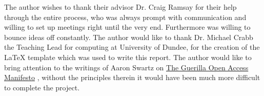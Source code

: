 \documentclass[sigconf, nonacm]{acmart}
\begin{document}
\begin{acks}
The author wishes to thank their advisor Dr. Craig Ramsay for their help through the entire process, who was always prompt with communication and willing to set up meetings right until the very end. Furthermore was willing to bounce ideas off constantly.
\newline
\newline
The author would like to thank Dr. Michael Crabb the Teaching Lead for computing at University of Dundee, for the creation of the LaTeX template which was used to write this report.
\newline
\newline
The author would like to bring attention to the writings of 
Aaron Swartz on \href{https://archive.org/stream/GuerillaOpenAccessManifesto/Goamjuly2008_djvu.txt}{\underline{The Guerilla Open Access Manifesto}} , without the principles therein it would have been much more difficult to complete the project.

\end{acks}




\appendix

\end{document}
